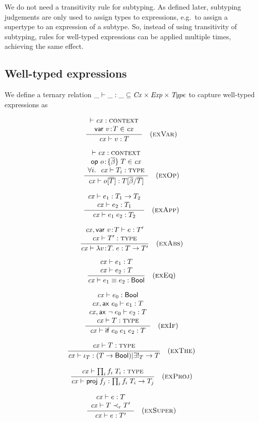 We do not need a transitivity rule for subtyping. As defined later, subtyping
judgements are only used to assign types to expressions, e.g.\ to assign a
supertype to an expression of a subtype. So, instead of using transitivity of
subtyping, rules for well-typed expressions can be applied multiple times,
achieving the same effect.

\subsection{Well-typed expressions}

We define a ternary relation $\_\vdash\_:\_\subseteq\mathit{Cx}\times\mathit{Exp}\times\mathit{Type}$ to capture
well-typed expressions as

\[
\frac{\begin{array}{c}\vdash\mathit{cx}:\textsc{context}\\\mathsf{var}\ v\!:\!T\in\mathit{cx}\end{array}}{\mathit{cx}\vdash v:T}\quad\mbox{(\textsc{exVar})}
\]

\[
\frac{\begin{array}{c}\vdash\mathit{cx}:\textsc{context}\\\mathsf{op}\ o\!:\!\{\overline{\beta}\}\;T\in\mathit{cx}\\\forall i.\ \ \mathit{cx}\vdash T_i:\textsc{type}\end{array}}{\mathit{cx}\vdash o[\overline{T}]:T[\overline{\beta}/\overline{T}]}\quad\mbox{(\textsc{exOp})}
\]

\[
\frac{\begin{array}{c}\mathit{cx}\vdash e_1:T_1\to T_2\\\mathit{cx}\vdash e_2:T_1\end{array}}{\mathit{cx}\vdash e_1\;e_2:T_2}\quad\mbox{(\textsc{exApp})}
\]

\[
\frac{\begin{array}{c}\mathit{cx},\mathsf{var}\ v\!:\!T\vdash e:T'\\\mathit{cx}\vdash T':\textsc{type}\end{array}}{\mathit{cx}\vdash\lambda v\!:\!T.\;e:T\to T'}\quad\mbox{(\textsc{exAbs})}
\]

\[
\frac{\begin{array}{c}\mathit{cx}\vdash e_1:T\\\mathit{cx}\vdash e_2:T\end{array}}{\mathit{cx}\vdash e_1\equiv e_2:\mathsf{Bool}}\quad\mbox{(\textsc{exEq})}
\]

\[
\frac{\begin{array}{c}\mathit{cx}\vdash e_0:\mathsf{Bool}\\\mathit{cx},\mathsf{ax}\ e_0\vdash e_1:T\\\mathit{cx},\mathsf{ax}\ \neg\;e_0\vdash e_2:T\\\mathit{cx}\vdash T:\textsc{type}\end{array}}{\mathit{cx}\vdash\mathsf{if}\;e_0\;e_1\;e_2:T}\quad\mbox{(\textsc{exIf})}
\]


\[
\frac{\begin{array}{c}\mathit{cx}\vdash T:\textsc{type}\end{array}}{\mathit{cx}\vdash\iota_{T}:(T\to\mathsf{Bool})|\exists!_{T}\to T}\quad\mbox{(\textsc{exThe})}
\]

\[
\frac{\begin{array}{c}\mathit{cx}\vdash\prod_{i}f_i\;T_i:\textsc{type}\end{array}}{\mathit{cx}\vdash\mathsf{proj}\;{f_j}:\prod_{i}f_i\;T_i\to T_j}\quad\mbox{(\textsc{exProj})}
\]



\[
\frac{\begin{array}{c}\mathit{cx}\vdash e:T\\\mathit{cx}\vdash T\prec_{r}T'\end{array}}{\mathit{cx}\vdash e:T'}\quad\mbox{(\textsc{exSuper})}
\]

